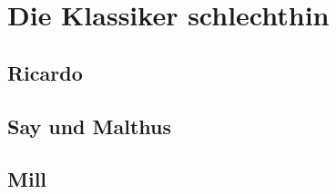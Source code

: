 %
%
%

\chapter{Die Klassiker schlechthin}
\label{Klassik}

\section{Ricardo}

\section{Say und Malthus}

\section{Mill}